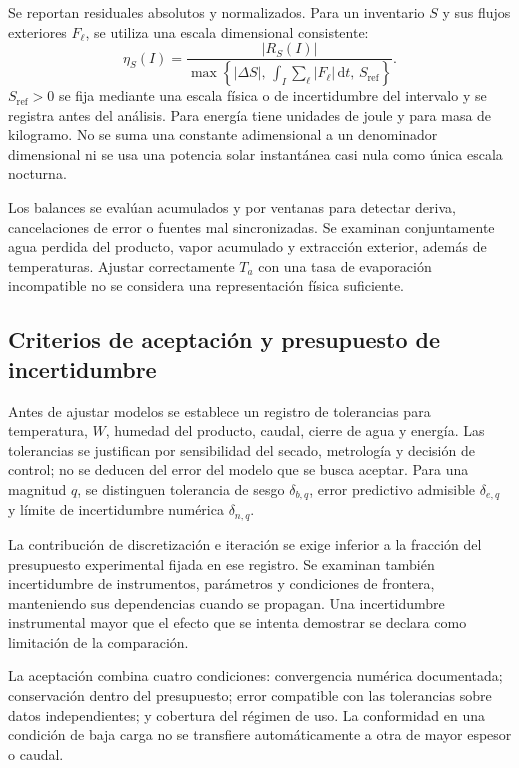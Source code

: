 Se reportan residuales absolutos y normalizados. Para un inventario $S$ y sus flujos exteriores $F_\ell$, se utiliza una escala dimensional consistente:
\begin{equation}
\eta_S(I)=
\frac{|R_S(I)|}
{\max\left\{
|\Delta S|,\,
\int_I\sum_\ell|F_\ell|\,\mathrm dt,\,
S_{\mathrm{ref}}
\right\}}.
\label{met:residual_normalizado}
\end{equation}
$S_{\mathrm{ref}}>0$ se fija mediante una escala física o de incertidumbre del intervalo y se registra antes del análisis. Para energía tiene unidades de joule y para masa de kilogramo. No se suma una constante adimensional a un denominador dimensional ni se usa una potencia solar instantánea casi nula como única escala nocturna.

Los balances se evalúan acumulados y por ventanas para detectar deriva, cancelaciones de error o fuentes mal sincronizadas. Se examinan conjuntamente agua perdida del producto, vapor acumulado y extracción exterior, además de temperaturas. Ajustar correctamente $T_a$ con una tasa de evaporación incompatible no se considera una representación física suficiente.

\subsection{Criterios de aceptación y presupuesto de incertidumbre}

Antes de ajustar modelos se establece un registro de tolerancias para temperatura, $W$, humedad del producto, caudal, cierre de agua y energía. Las tolerancias se justifican por sensibilidad del secado, metrología y decisión de control; no se deducen del error del modelo que se busca aceptar. Para una magnitud $q$, se distinguen tolerancia de sesgo $\delta_{b,q}$, error predictivo admisible $\delta_{e,q}$ y límite de incertidumbre numérica $\delta_{n,q}$.

La contribución de discretización e iteración se exige inferior a la fracción del presupuesto experimental fijada en ese registro. Se examinan también incertidumbre de instrumentos, parámetros y condiciones de frontera, manteniendo sus dependencias cuando se propagan. Una incertidumbre instrumental mayor que el efecto que se intenta demostrar se declara como limitación de la comparación.

La aceptación combina cuatro condiciones: convergencia numérica documentada; conservación dentro del presupuesto; error compatible con las tolerancias sobre datos independientes; y cobertura del régimen de uso. La conformidad en una condición de baja carga no se transfiere automáticamente a otra de mayor espesor o caudal.

